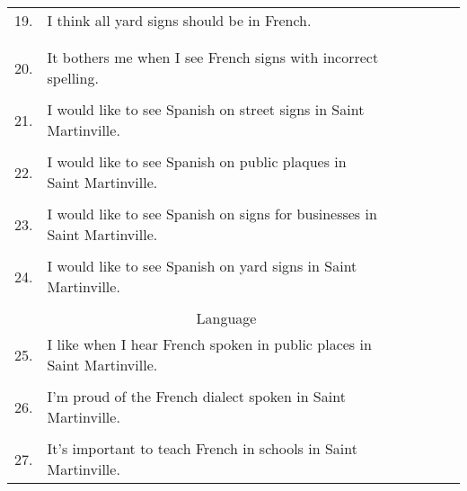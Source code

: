 \begin{longtable}[c]{| r p{} | c | c | c | c | c |}
      \hline
      19. & I think all yard signs should be in French.                               & & & & & \\
          &                                                                           & & & & & \\
          &                                                                           & & & & & \\
      \hline
      20. & It bothers me when I see French signs with incorrect spelling.            & & & & & \\
          &                                                                           & & & & & \\
      \hline
      21. & I would like to see Spanish on street signs in Saint Martinville.         & & & & & \\
          &                                                                           & & & & & \\
      \hline
      22. & I would like to see Spanish on public plaques in Saint Martinville.       & & & & & \\
          &                                                                           & & & & & \\
      \hline
      23. & I would like to see Spanish on signs for businesses in Saint Martinville. & & & & & \\
          &                                                                           & & & & & \\
      \hline
      24. & I would like to see Spanish on yard signs in Saint Martinville.           & & & & & \\
          &                                                                           & & & & & \\
      \hline
      \multicolumn{6}{c}{Language} \\
      \hline
      25. & I like when I hear French spoken in public places in Saint Martinville.   & & & & & \\
          &                                                                           & & & & & \\
      \hline
      26. & I'm proud of the French dialect spoken in Saint Martinville.              & & & & & \\
          &                                                                           & & & & & \\
      \hline
      27. & It's important to teach French in schools in Saint Martinville.           & & & & & \\

\end{longtable}
